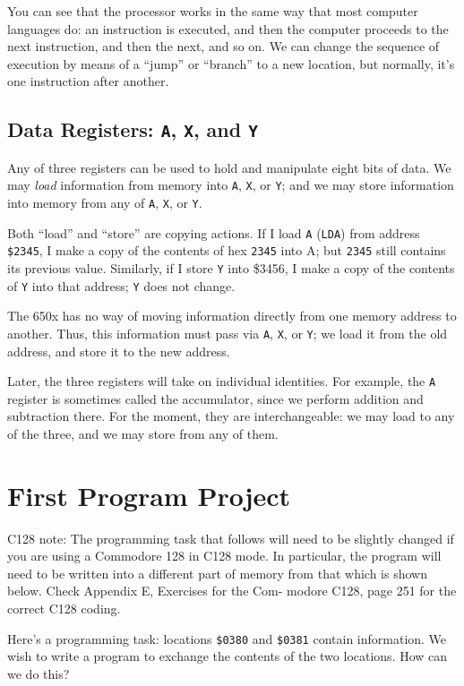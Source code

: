 \documentclass[11pt,a4paper,titlepage]{memoir}
\begin{document}
You can see that the processor works in the same way that most computer
languages do: an instruction is executed, and then the computer proceeds
to the next instruction, and then the next, and so on. We can change the
sequence of execution by means of a ``jump'' or ``branch'' to a new location,
but normally, it's one instruction after another.
\subsection{Data Registers: \texttt{A}, \texttt{X}, and \texttt{Y}}
Any of three registers can be used to hold and manipulate eight bits of
data. We may \emph{load} information from memory into \texttt{A}, \texttt{X}, or \texttt{Y}; and we may
store information into memory from any of \texttt{A}, \texttt{X}, or \texttt{Y}.

Both ``load'' and ``store'' are copying actions. If I load \texttt{A} (\texttt{LDA}) from
address \texttt{\$2345}, I make a copy of the contents of hex \texttt{2345} into A; but
\texttt{2345} still contains its previous value. Similarly, if I store \texttt{Y} into \$3456,
I make a copy of the contents of \texttt{Y} into that address; \texttt{Y} does not change.

The 650x has no way of moving information directly from one memory
address to another. Thus, this information must pass via \texttt{A}, \texttt{X}, or \texttt{Y}; we
load it from the old address, and store it to the new address.

Later, the three registers will take on individual identities. For example,
the \texttt{A} register is sometimes called the accumulator, since we perform
addition and subtraction there. For the moment, they are interchangeable:
we may load to any of the three, and we may store from any of them.
\section{First Program Project}
C128 note: The programming task that follows will need to be slightly
changed if you are using a Commodore 128 in C128 mode. In particular,
the program will need to be written into a different part of memory from
that which is shown below. Check Appendix E, Exercises for the Com-
modore C128, page 251 for the correct C128 coding.

Here's a programming task: locations \texttt{\$0380} and \texttt{\$0381} contain information. We wish to write a program to exchange the contents of the
two locations. How can we do this?
\end{document}
